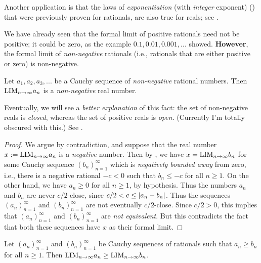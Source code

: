 Another application is that the laws of \emph{exponentiation} (with \emph{integer} exponent) () that were previously proven for rationals, are also true for reals;
see .

We have already seen that the formal limit of positive rationals need not be positive; it could be zero, as the example \(0.1, 0.01, 0.001,...\) showed.
\textbf{However}, the formal limit of \emph{non-negative} rationals (i.e., rationals that are either positive or zero) is non-negative.

\begin{proposition}  \label{prop 5.4.9}
Let \(a_1, a_2, a_3,...\) be a Cauchy sequence of \emph{non-negative} rational numbers.
Then \(\text{LIM}_{n \to \infty} a_n\) is a \emph{non-negative} real number.
\end{proposition}

\begin{note}
Eventually, we will see a \emph{better explanation} of this fact: 
the set of non-negative reals is \emph{closed}, whereas the set of positive reals is \emph{open}. (Currently I'm totally obscured with this.)
See .
\end{note}

\begin{proof}
We argue by contradiction, and suppose that the real number \(x := \text{LIM}_{n \to \infty} a_n\) is a \emph{negative} number.
Then by , we have \(x = \text{LIM}_{n \to \infty} b_n\) for some Cauchy sequence \((b_n)_{n = 1}^{\infty}\) which is \emph{negatively bounded away} from zero,
i.e., there is a negative rational \(-c < 0\) such that \(b_n \le -c\) for all \(n \ge 1\).
On the other hand, we have \(a_n \ge 0\) for all \(n \ge 1\), by hypothesis.
Thus the numbers \(a_n\) and \(b_n\) are never \(c/2\)-close, since \(c/2 < c \le \lvert a_n - b_n\rvert\).
Thus the sequences \((a_n)_{n = 1}^{\infty}\) and \((b_n)_{n = 1}^{\infty}\) are not eventually \(c/2\)-close.
Since \(c/2 > 0\), this implies that \((a_n)_{n = 1}^{\infty}\) and \((b_n)_{n = 1}^{\infty}\) are \emph{not equivalent}.
But this contradicts the fact that both these sequences have \(x\) as their formal limit.
\end{proof}

\begin{corollary} \label{corollary 5.4.10}
Let \((a_n)_{n = 1}^{\infty}\) and \((b_n)_{n = 1}^{\infty}\) be Cauchy sequences of rationals such that \(a_n \ge b_n\) for all \(n \ge 1\).
Then \(\text{LIM}_{n \to \infty} a_n \ge \text{LIM}_{n \to \infty} b_n\).
\end{corollary}

